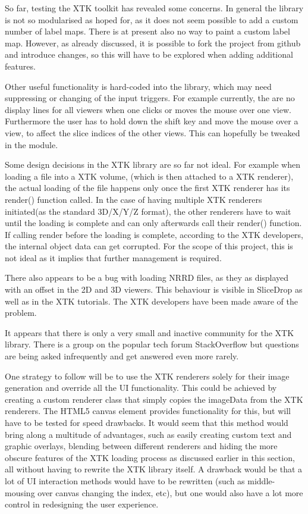 \documentclass[a4paper,11pt,titlepage]{article}
\begin{document}
So far, testing the XTK toolkit has revealed some concerns. In general the library is not so modularised as hoped for, as it does not seem possible to add a custom number of label maps. There is at present also no way to paint a custom label map. However, as already discussed, it is possible to fork the project from github and introduce changes, so this will have to be explored when adding additional features.

Other useful functionality is hard-coded into the library, which may need suppressing or changing of the input triggers. For example currently, the are no display lines for all viewers when one clicks or moves the mouse over one view. Furthermore the user has to hold down the shift key and move the mouse over a view, to affect the slice indices of the other views. This can hopefully be tweaked in the module.

Some design decisions in the XTK library are so far not ideal. For example when loading a file into a XTK volume, (which is then attached to a XTK renderer), the actual loading of the file happens only once the first XTK renderer has its render() function called. In the case of having multiple XTK renderers initiated(as the standard 3D/X/Y/Z format), the other renderers have to wait until the loading is complete and can only afterwards call their render() function. If calling render before the loading is complete, according to the XTK developers, the internal object data can get corrupted. For the scope of this project, this is not ideal as it implies that further management is required.

There also appears to be a bug with loading NRRD files, as they as displayed with an offset in the 2D and 3D viewers. This behaviour is visible in SliceDrop as well as in the XTK tutorials. The XTK developers have been made aware of the problem.

It appears that there is only a very small and inactive community for the XTK library. There is a group on the popular tech forum StackOverflow but questions are being asked infrequently and get answered even more rarely.

One strategy to follow will be to use the XTK renderers solely for their image generation and override all the UI functionality. This could be achieved by creating a custom renderer class that simply copies the imageData from the XTK renderers. The HTML5 canvas element provides functionality for this, but will have to be tested for speed drawbacks. It would seem that this method would bring along a multitude of advantages, such as easily creating custom text and graphic overlays, blending between different renderers and hiding the more obscure features of the XTK loading process as discussed earlier in this section, all without having to rewrite the XTK library itself. A drawback would be that a lot of UI interaction methods would have to be rewritten (such as middle-mousing over canvas changing the index, etc), but one would also have a lot more control in redesigning the user experience.
\end{document}
